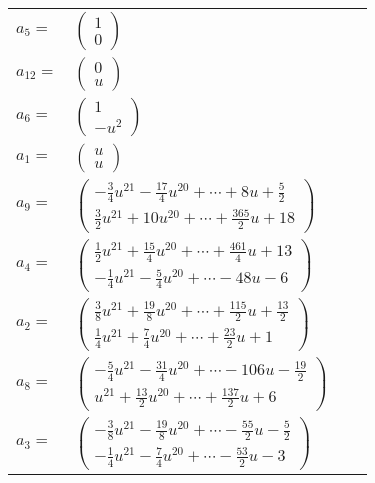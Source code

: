 \documentclass[1p]{elsarticle_modified}
\theoremstyle{definition}
\begin{document}
\begin{tabular}{m{7pt} m{180pt} m{7pt} m{180pt} }
\flushright $a_{5}=$&$\begin{pmatrix}1\\0\end{pmatrix}$ \\
\flushright $a_{12}=$&$\begin{pmatrix}0\\u\end{pmatrix}$ \\
\flushright $a_{6}=$&$\begin{pmatrix}1\\- u^2\end{pmatrix}$ \\
\flushright $a_{1}=$&$\begin{pmatrix}u\\u\end{pmatrix}$ \\
\flushright $a_{9}=$&$\begin{pmatrix}-\frac{3}{4} u^{21}-\frac{17}{4} u^{20}+\cdots+8 u+\frac{5}{2}\\\frac{3}{2} u^{21}+10 u^{20}+\cdots+\frac{365}{2} u+18\end{pmatrix}$ \\
\flushright $a_{4}=$&$\begin{pmatrix}\frac{1}{2} u^{21}+\frac{15}{4} u^{20}+\cdots+\frac{461}{4} u+13\\-\frac{1}{4} u^{21}-\frac{5}{4} u^{20}+\cdots-48 u-6\end{pmatrix}$ \\
\flushright $a_{2}=$&$\begin{pmatrix}\frac{3}{8} u^{21}+\frac{19}{8} u^{20}+\cdots+\frac{115}{2} u+\frac{13}{2}\\\frac{1}{4} u^{21}+\frac{7}{4} u^{20}+\cdots+\frac{23}{2} u+1\end{pmatrix}$ \\
\flushright $a_{8}=$&$\begin{pmatrix}-\frac{5}{4} u^{21}-\frac{31}{4} u^{20}+\cdots-106 u-\frac{19}{2}\\u^{21}+\frac{13}{2} u^{20}+\cdots+\frac{137}{2} u+6\end{pmatrix}$ \\
\flushright $a_{3}=$&$\begin{pmatrix}-\frac{3}{8} u^{21}-\frac{19}{8} u^{20}+\cdots-\frac{55}{2} u-\frac{5}{2}\\-\frac{1}{4} u^{21}-\frac{7}{4} u^{20}+\cdots-\frac{53}{2} u-3\end{pmatrix}$ \\

\end{tabular}
\end{document}
